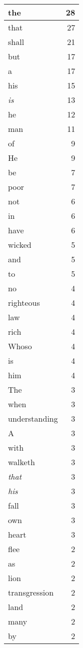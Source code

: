 \begin{center}
\begin{longtable}{l|r}
the & 28\\ \hline 
that & 27\\ \hline 
shall & 21\\ \hline 
but & 17\\ \hline 
a & 17\\ \hline 
his & 15\\ \hline 
\emph{is} & 13\\ \hline 
he & 12\\ \hline 
man & 11\\ \hline 
of & 9\\ \hline 
He & 9\\ \hline 
be & 7\\ \hline 
poor & 7\\ \hline 
not & 6\\ \hline 
in & 6\\ \hline 
have & 6\\ \hline 
wicked & 5\\ \hline 
and & 5\\ \hline 
to & 5\\ \hline 
no & 4\\ \hline 
righteous & 4\\ \hline 
law & 4\\ \hline 
rich & 4\\ \hline 
Whoso & 4\\ \hline 
is & 4\\ \hline 
him & 4\\ \hline 
The & 3\\ \hline 
when & 3\\ \hline 
understanding & 3\\ \hline 
A & 3\\ \hline 
with & 3\\ \hline 
walketh & 3\\ \hline 
\emph{that} & 3\\ \hline 
\emph{his} & 3\\ \hline 
fall & 3\\ \hline 
own & 3\\ \hline 
heart & 3\\ \hline 
flee & 2\\ \hline 
as & 2\\ \hline 
lion & 2\\ \hline 
transgression & 2\\ \hline 
land & 2\\ \hline 
many & 2\\ \hline 
by & 2\\ \hline 

\end{longtable}
\end{center}
